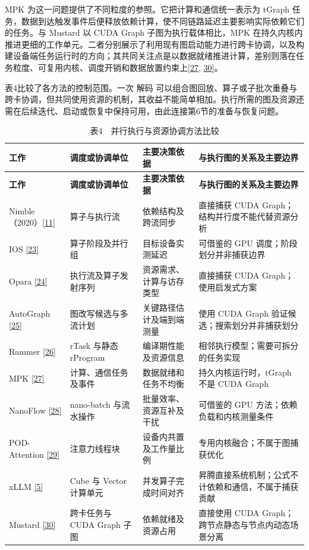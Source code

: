 \documentclass[UTF8,11pt,fontset=windows]{ctexart}
\begin{document}
MPK 为这一问题提供了不同粒度的参照。它把计算和通信统一表示为 tGraph 任务，数据到达触发事件后便释放依赖计算，使不同链路延迟主要影响实际依赖它们的任务。与 Mustard 以 CUDA Graph 子图为执行载体相比，MPK 在持久内核内推进更细的工作单元。二者分别展示了利用现有图启动能力进行跨卡协调，以及构建设备端任务运行时的方向；其共同关注点是以数据就绪推进计算，差别则落在任务粒度、可复用内核、调度开销和数据放置约束上\protect\hyperlink{ref-27}{{[}27}, \protect\hyperlink{ref-30}{30{]}}。

表4比较了各方法的控制范围。一次 解码 可以组合图回放、算子或子批次重叠与跨卡协调，但共同使用资源的机制，其收益不能简单相加。执行所需的图及资源还需在后续迭代、启动或恢复中保持可用，由此连接第6节的准备与恢复问题。

\begingroup\small
\begin{longtable}[]{@{}>{\raggedright\arraybackslash}p{}>{\raggedright\arraybackslash}p{}>{\raggedright\arraybackslash}p{}>{\raggedright\arraybackslash}p{}@{}}
\caption{表4　并行执行与资源协调方法比较}\tabularnewline
\toprule
\textbf{工作} & \textbf{调度或协调单位} & \textbf{主要决策依据} & \textbf{与执行图的关系及主要边界} \\
\midrule
\endfirsthead
\toprule
\textbf{工作} & \textbf{调度或协调单位} & \textbf{主要决策依据} & \textbf{与执行图的关系及主要边界} \\
\midrule
\endhead
Nimble（2020）\protect\hyperlink{ref-11}{{[}11{]}} & 算子与执行流 & 依赖结构及跨流同步 & 直接捕获 CUDA Graph；结构并行度不能代替资源分析 \\
IOS \protect\hyperlink{ref-23}{{[}23{]}} & 算子阶段及并行组 & 目标设备实测延迟 & 可借鉴的 GPU 调度；阶段划分并非捕获边界 \\
Opara \protect\hyperlink{ref-24}{{[}24{]}} & 执行流及算子发射序列 & 资源需求、计算与访存类型 & 直接捕获 CUDA Graph；使用启发式方案 \\
AutoGraph \protect\hyperlink{ref-25}{{[}25{]}} & 图改写候选与多流计划 & 关键路径估计及端到端测量 & 使用 CUDA Graph 验证候选；搜索划分并非捕获划分 \\
Rammer \protect\hyperlink{ref-26}{{[}26{]}} & rTask 与静态 rProgram & 编译期性能及资源信息 & 相邻执行模型；需要可拆分的任务实现 \\
MPK \protect\hyperlink{ref-27}{{[}27{]}} & 计算、通信任务及事件 & 数据就绪和任务不均衡 & 持久内核运行时，tGraph 不是 CUDA Graph \\
NanoFlow \protect\hyperlink{ref-28}{{[}28{]}} & nano-batch 与流水操作 & 批量效率、资源互补及干扰 & 可借鉴的 GPU 方法；依赖负载和内核测量条件 \\
POD-Attention \protect\hyperlink{ref-29}{{[}29{]}} & 注意力线程块 & 设备内共置及工作量比例 & 专用内核融合；不属于图捕获优化 \\
xLLM \protect\hyperlink{ref-5}{{[}5{]}} & Cube 与 Vector 计算单元 & 并发算子完成时间对齐 & 昇腾直接系统机制；公式不计依赖和通信，不属于捕获贡献 \\
Mustard \protect\hyperlink{ref-30}{{[}30{]}} & 跨卡任务与 CUDA Graph 子图 & 依赖就绪及资源占用 & 直接使用 CUDA Graph；跨节点静态与节点内动态场景分离 \\
\bottomrule
\end{longtable}
\end{document}
